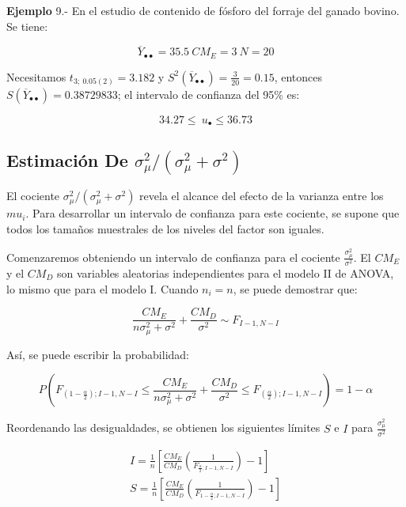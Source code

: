 \documentclass[]{book}
\theoremstyle{definition}
\theoremstyle{definition}
\theoremstyle{definition}
\theoremstyle{remark}
\begin{document}
\textbf{Ejemplo} 9.- En el estudio de contenido de fósforo del forraje
del ganado bovino. Se tiene:

\[
{\overline{Y}}_{\bullet\bullet} = 35.5\ CM_E = 3\ N = 20
\]

Necesitamos \(t_{3;\ 0.05\left( 2 \right)} = 3.182\) y
\(S^{2}\left( {\overline{Y}}_{\bullet \bullet} \right) = \frac{3}{20} = 0.15\),
entonces
\(S\left( {\overline{Y}}_{\bullet \bullet} \right) = 0.38729833\); el
intervalo de confianza del 95\% es:

\[
34.27 \leq \ u_{\bullet} \leq 36.73
\]

\hypertarget{estimacion-de-sigma_mu2left-sigma_mu2sigma2-right}{%
\subsection{\texorpdfstring{Estimación De
\(\sigma_{\mu}^2/\left ( \sigma_{\mu}^2+\sigma^2 \right )\)}{Estimación De \textbackslash{}sigma\_\{\textbackslash{}mu\}\^{}2/\textbackslash{}left ( \textbackslash{}sigma\_\{\textbackslash{}mu\}\^{}2+\textbackslash{}sigma\^{}2 \textbackslash{}right )}}\label{estimacion-de-sigma_mu2left-sigma_mu2sigma2-right}}

El cociente \(\sigma_{\mu}^2/\left (\sigma_{\mu}^2+\sigma^2 \right )\)
revela el alcance del efecto de la varianza entre los \(mu_{i}\). Para
desarrollar un intervalo de confianza para este cociente, se supone que
todos los tamaños muestrales de los niveles del factor son iguales.

Comenzaremos obteniendo un intervalo de confianza para el cociente
\(\frac{\sigma_{\mu}^{2}}{\sigma^{2}}\). El \(CM_E\) y el \(CM_D\) son
variables aleatorias independientes para el modelo II de ANOVA, lo mismo
que para el modelo I. Cuando \(n_{i} = n\), se puede demostrar que:

\[
\frac{CM_E}{n\sigma_{\mu}^{2} + \sigma^{2}} + \frac{CM_D}{\sigma^{2}}\sim F_{I - 1,N - I}
\]

Así, se puede escribir la probabilidad:

\[
P\left( F_{\left( 1 - \frac{\alpha}{2} \right);I - 1,N - I} \leq \frac{CM_E}{n\sigma_{\mu}^{2} + \sigma^{2}} + \frac{CM_D}{\sigma^{2}} \leq F_{\left( \frac{\alpha}{2} \right);I - 1,N - I} \right) = 1 - \alpha
\]

Reordenando las desigualdades, se obtienen los siguientes límites \(S\)
e \(I\) para \(\frac{\sigma_{\mu}^{2}}{\sigma^{2}}\)

\[
\begin{matrix}
I = \frac{1}{n}\left\lbrack \frac{CM_E}{CM_D}\left( \frac{1}{F_{\frac{\alpha}{2};I - 1,N - I}} \right) - 1 \right\rbrack \\
S = \frac{1}{n}\left\lbrack \frac{CM_E}{CM_D}\left( \frac{1}{F_{1 - \frac{\alpha}{2};I - 1,N - I}} \right) - 1 \right\rbrack \\
\end{matrix}
\]
\end{document}
